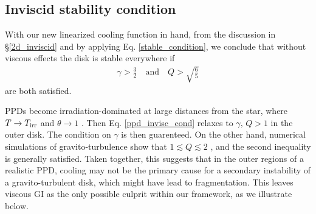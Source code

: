 
\subsection{Inviscid stability condition}
With our new linearized cooling function in hand, from the discussion
in \S\ref{2d_inviscid} and by applying 
Eq. \ref{stable_condition},  we conclude that without viscous effects 
the disk is stable everywhere if  
\begin{align} 
  \gamma > \frac{3}{2} \quad \text{and} \quad Q >
  \sqrt{\frac{6}{5}} \label{ppd_invisc_cond} 
\end{align} 
are both satisfied.  

PPDs become irradiation-dominated at large distances from the star,
where $T\to T_\mathrm{irr}$ and $\theta\to 1$ \citep{dalessio97,kratter11}.
Then Eq. \ref{ppd_invisc_cond} relaxes to 
$\gamma,\, Q > 1$ in the outer disk. The condition on $\gamma$
is then guarenteed. On the other hand, numerical 
simulations of gravito-turbulence show that $1\lesssim Q \lesssim 2$
\citep{gammie01,rice11}, and the second inequality is generally
satisfied.   
Taken together, this suggests that in the outer regions of a realistic
PPD, cooling %
may not be the primary cause for a secondary 
instability of a gravito-turbulent disk, which might have lead to
fragmentation. This leaves viscous GI as the only possible culprit
within our framework, as we illustrate below.  

